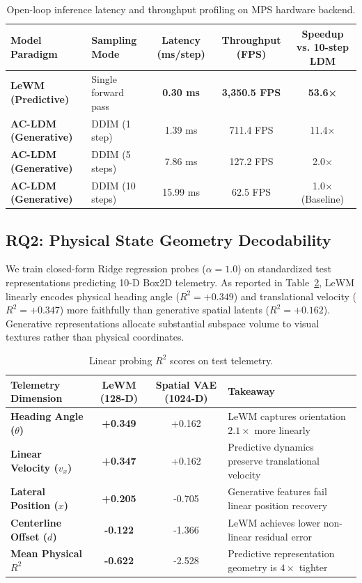 \documentclass{article}
\begin{document}
\begin{table}[h]
    \centering
    \caption{Open-loop inference latency and throughput profiling on MPS hardware backend.}
    \label{tab:latency}
    \begin{tabular}{llccc}
        \toprule
        \textbf{Model Paradigm} & \textbf{Sampling Mode} & \textbf{Latency (ms/step)} & \textbf{Throughput (FPS)} & \textbf{Speedup vs. 10-step LDM} \\
        \midrule
        \textbf{LeWM (Predictive)} & Single forward pass & \textbf{0.30 ms} & \textbf{3,350.5 FPS} & \textbf{53.6×} \\
        \textbf{AC-LDM (Generative)} & DDIM (1 step) & 1.39 ms & 711.4 FPS & 11.4× \\
        \textbf{AC-LDM (Generative)} & DDIM (5 steps) & 7.86 ms & 127.2 FPS & 2.0× \\
        \textbf{AC-LDM (Generative)} & DDIM (10 steps) & 15.99 ms & 62.5 FPS & 1.0× (Baseline) \\
        \bottomrule
    \end{tabular}
\end{table}

\subsection{RQ2: Physical State Geometry Decodability}
We train closed-form Ridge regression probes ($\alpha = 1.0$) on standardized test representations predicting 10-D Box2D telemetry. As reported in Table~\ref{tab:probing}, LeWM linearly encodes physical heading angle ($R^2 = +0.349$) and translational velocity ($R^2 = +0.347$) more faithfully than generative spatial latents ($R^2 = +0.162$). Generative representations allocate substantial subspace volume to visual textures rather than physical coordinates.

\begin{table}[h]
    \centering
    \caption{Linear probing $R^2$ scores on test telemetry.}
    \label{tab:probing}
    \begin{tabular}{lccl}
        \toprule
        \textbf{Telemetry Dimension} & \textbf{LeWM (128-D)} & \textbf{Spatial VAE (1024-D)} & \textbf{Takeaway} \\
        \midrule
        \textbf{Heading Angle ($\theta$)} & \textbf{+0.349} & +0.162 & LeWM captures orientation $2.1\times$ more linearly \\
        \textbf{Linear Velocity ($v_x$)} & \textbf{+0.347} & +0.162 & Predictive dynamics preserve translational velocity \\
        \textbf{Lateral Position ($x$)} & \textbf{+0.205} & -0.705 & Generative features fail linear position recovery \\
        \textbf{Centerline Offset ($d$)} & \textbf{-0.122} & -1.366 & LeWM achieves lower non-linear residual error \\
        \textbf{Mean Physical $R^2$} & \textbf{-0.622} & -2.528 & Predictive representation geometry is $4\times$ tighter \\
        \bottomrule
    \end{tabular}
\end{table}
\end{document}

